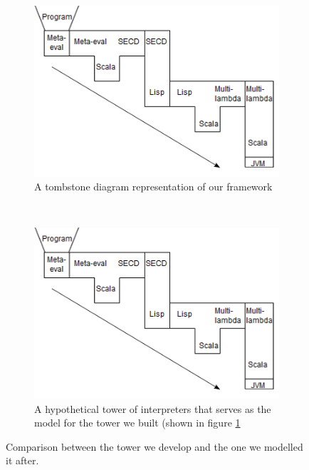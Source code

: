 \documentclass[a4paper,12pt,twoside,openright]{report}
\theoremstyle{definition}
\begin{document}

\begin{figure}[htp!]
\centering
    \begin{subfigure}{0.5\linewidth}
    	\centering
    	\includegraphics[scale=2]{tombstone_tower.png}
    	\caption{A tombstone diagram representation of our framework}
    	\label{fig:tombstone}
    \end{subfigure}\\[1ex]
    \par\bigskip
    \begin{subfigure}{0.5\linewidth}
        \centering
        \includegraphics[scale=2]{tombstone_practical.png}
        \caption{A hypothetical tower of interpreters that serves as the model for the tower we built (shown in figure \ref{fig:tombstone}}
        \label{fig:tombstone_practical}
    \end{subfigure}
\caption{Comparison between the tower we develop and the one we modelled it after.}
\label{fig:tombstone_all}
\end{figure}
\end{document}

